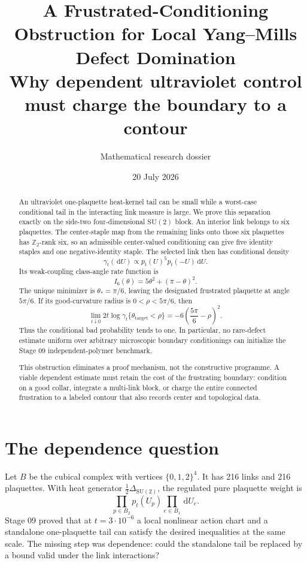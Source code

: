 \documentclass[11pt]{article}
\title{A Frustrated-Conditioning Obstruction for Local Yang--Mills Defect Domination\\
\large Why dependent ultraviolet control must charge the boundary to a contour}
\author{Mathematical research dossier}
\date{20 July 2026}
\theoremstyle{definition}
\newcommand{\SU}{\mathrm{SU}(2)}
\newcommand{\Ztwo}{\mathbb Z_2}
\newcommand{\dd}{\,\mathrm{d}}
\begin{document}
\maketitle

\begin{abstract}
An ultraviolet one-plaquette heat-kernel tail can be small while a
worst-case conditional tail in the interacting link measure is large.  We
prove this separation exactly on the side-two four-dimensional $\SU$ block.
An interior link belongs to six plaquettes.  The center-staple map from the
remaining links onto those six plaquettes has $\Ztwo$-rank six, so an
admissible center-valued conditioning can give five identity staples and one
negative-identity staple.  The selected link then has conditional density
\[
 \gamma_t(\dd U)\propto p_t(U)^5p_t(-U)\dd U.
\]
Its weak-coupling class-angle rate function is
\[
 I_6(\theta)=5\theta^2+(\pi-\theta)^2.
\]
The unique minimizer is $\theta_*=\pi/6$, leaving the designated frustrated
plaquette at angle $5\pi/6$.  If its good-curvature radius is
$0<\rho<5\pi/6$, then
\[
 \lim_{t\downarrow0}2t\log
 \gamma_t\{\theta_{\mathrm{target}}<\rho\}
 =-6\left(\frac{5\pi}{6}-\rho\right)^2.
\]
Thus the conditional bad probability tends to one.  In particular, no
rare-defect estimate uniform over arbitrary microscopic boundary
conditionings can initialize the Stage 09 independent-polymer benchmark.

This obstruction eliminates a proof mechanism, not the constructive
programme.  A viable dependent estimate must retain the cost of the
frustrating boundary: condition on a good collar, integrate a multi-link
block, or charge the entire connected frustration to a labeled contour that
also records center and topological data.
\end{abstract}

\tableofcontents

\section{The dependence question}

Let $B$ be the cubical complex with vertices $\{0,1,2\}^4$.  It has 216 links
and 216 plaquettes.  With heat generator $\tfrac12\Delta_{\SU}$, the regulated
pure plaquette weight is
\[
 \prod_{p\in B_2}p_t(U_p)\prod_{e\in B_1}\dd U_e.
\]
Stage 09 proved that at $t=3\cdot10^{-6}$ a local nonlinear action chart and a
standalone one-plaquette tail can satisfy the desired inequalities at the same
scale.  The missing step was dependence: could the standalone tail be
replaced by a bound valid under the link interactions?
\end{document}
